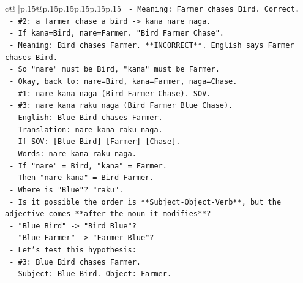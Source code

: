 \documentclass{article}
\begin{document}
{\begin{supertabular}{c@{$\;$}|p{.15\linewidth}@{}p{.15\linewidth}p{.15\linewidth}p{.15\linewidth}p{.15\linewidth}p{.15\linewidth}}
{{{\texttt{                           {-} Meaning: Farmer chases Bird. Correct.} \\
\texttt{                         {-} \#2: a farmer chase a bird {-}> kana nare naga.} \\
\texttt{                           {-} If kana=Bird, nare=Farmer. "Bird Farmer Chase".} \\
\texttt{                           {-} Meaning: Bird chases Farmer. **INCORRECT**. English says Farmer chases Bird.} \\
\texttt{                         {-} So "nare" must be Bird, "kana" must be Farmer.} \\
\texttt{                     {-} Okay, back to: nare=Bird, kana=Farmer, naga=Chase.} \\
\texttt{                     {-} \#1: nare kana naga (Bird Farmer Chase). SOV.} \\
\texttt{                     {-} \#3: nare kana raku naga (Bird Farmer Blue Chase).} \\
\texttt{                       {-} English: Blue Bird chases Farmer.} \\
\texttt{                       {-} Translation: nare kana raku naga.} \\
\texttt{                       {-} If SOV: {[}Blue Bird{]} {[}Farmer{]} {[}Chase{]}.} \\
\texttt{                       {-} Words: nare kana raku naga.} \\
\texttt{                       {-} If "nare" = Bird, "kana" = Farmer.} \\
\texttt{                       {-} Then "nare kana" = Bird Farmer.} \\
\texttt{                       {-} Where is "Blue"? "raku".} \\
\texttt{                       {-} Is it possible the order is **Subject{-}Object{-}Verb**, but the adjective comes **after the noun it modifies**?} \\
\texttt{                         {-} "Blue Bird" {-}> "Bird Blue"?} \\
\texttt{                         {-} "Blue Farmer" {-}> "Farmer Blue"?} \\
\texttt{                         {-} Let's test this hypothesis:} \\
\texttt{                           {-} \#3: Blue Bird chases Farmer.} \\
\texttt{                             {-} Subject: Blue Bird. Object: Farmer.} \\
}}}
\end{supertabular}}
\end{document}
